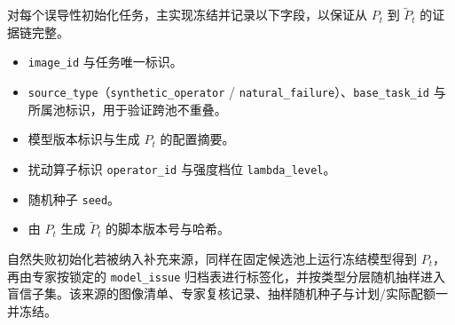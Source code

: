 对每个误导性初始化任务，主实现冻结并记录以下字段，以保证从 $P_t$ 到 $\tilde{P}_t$ 的证据链完整。
\begin{itemize}
    \item \texttt{image\_id} 与任务唯一标识。
    \item \texttt{source\_type}（\texttt{synthetic\_operator} / \texttt{natural\_failure}）、\texttt{base\_task\_id} 与所属池标识，用于验证跨池不重叠。
    \item 模型版本标识与生成 $P_t$ 的配置摘要。
    \item 扰动算子标识 \texttt{operator\_id} 与强度档位 \texttt{lambda\_level}。
    \item 随机种子 \texttt{seed}。
    \item 由 $P_t$ 生成 $\tilde{P}_t$ 的脚本版本号与哈希。
\end{itemize}

自然失败初始化若被纳入补充来源，同样在固定候选池上运行冻结模型得到 $P_t$，再由专家按锁定的 \texttt{model\_issue} 归档表进行标签化，并按类型分层随机抽样进入盲信子集。该来源的图像清单、专家复核记录、抽样随机种子与计划/实际配额一并冻结。